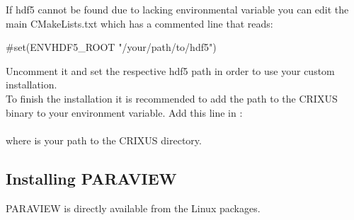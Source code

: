 If hdf5 cannot be found due to lacking environmental variable you can edit the main CMakeLists.txt which has a commented line that reads:
\begin{shellcode}
#set(ENV{HDF5_ROOT} "/your/path/to/hdf5")
\end{shellcode}
Uncomment it and set the respective hdf5 path in order to use your custom installation.\\

To finish the installation it is recommended to add the path to the CRIXUS binary to your
 environment variable. Add this line in :\\
\\
where  is your path to the CRIXUS directory.

\subsection{Installing PARAVIEW}

PARAVIEW is directly available from the Linux packages.
